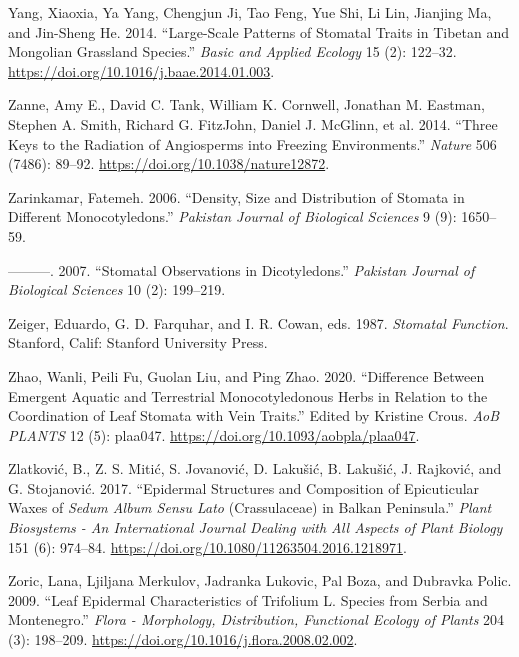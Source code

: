 \documentclass[
  12pt,
]{article}
\newlength{\cslhangindent}
\newlength{\cslentryspacingunit} %
\newenvironment{CSLReferences}[2] %
 {%
  \setlength{\parindent}{0pt}
  \ifodd #1
  \let\oldpar\par
  \def\par{\hangindent=\cslhangindent\oldpar}
  \fi
  \setlength{\parskip}{#2\cslentryspacingunit}
 }%
 {}
\begin{document}
\begin{CSLReferences}{1}{0}
\leavevmode{}%
Yang, Xiaoxia, Ya Yang, Chengjun Ji, Tao Feng, Yue Shi, Li Lin, Jianjing Ma, and Jin-Sheng He. 2014. {``Large-Scale Patterns of Stomatal Traits in {Tibetan} and {Mongolian} Grassland Species.''} \emph{Basic and Applied Ecology} 15 (2): 122--32. \url{https://doi.org/10.1016/j.baae.2014.01.003}.

\leavevmode{}%
Zanne, Amy E., David C. Tank, William K. Cornwell, Jonathan M. Eastman, Stephen A. Smith, Richard G. FitzJohn, Daniel J. McGlinn, et al. 2014. {``Three Keys to the Radiation of Angiosperms into Freezing Environments.''} \emph{Nature} 506 (7486): 89--92. \url{https://doi.org/10.1038/nature12872}.

\leavevmode{}%
Zarinkamar, Fatemeh. 2006. {``Density, Size and Distribution of Stomata in Different Monocotyledons.''} \emph{Pakistan Journal of Biological Sciences} 9 (9): 1650--59.

\leavevmode{}%
---------. 2007. {``Stomatal Observations in Dicotyledons.''} \emph{Pakistan Journal of Biological Sciences} 10 (2): 199--219.

\leavevmode{}%
Zeiger, Eduardo, G. D. Farquhar, and I. R. Cowan, eds. 1987. \emph{Stomatal Function}. Stanford, Calif: Stanford University Press.

\leavevmode{}%
Zhao, Wanli, Peili Fu, Guolan Liu, and Ping Zhao. 2020. {``Difference Between Emergent Aquatic and Terrestrial Monocotyledonous Herbs in Relation to the Coordination of Leaf Stomata with Vein Traits.''} Edited by Kristine Crous. \emph{AoB PLANTS} 12 (5): plaa047. \url{https://doi.org/10.1093/aobpla/plaa047}.

\leavevmode{}%
Zlatković, B., Z. S. Mitić, S. Jovanović, D. Lakušić, B. Lakušić, J. Rajković, and G. Stojanović. 2017. {``Epidermal Structures and Composition of Epicuticular Waxes of \emph{{Sedum} Album Sensu Lato} ({Crassulaceae}) in {Balkan} {Peninsula}.''} \emph{Plant Biosystems - An International Journal Dealing with All Aspects of Plant Biology} 151 (6): 974--84. \url{https://doi.org/10.1080/11263504.2016.1218971}.

\leavevmode{}%
Zoric, Lana, Ljiljana Merkulov, Jadranka Lukovic, Pal Boza, and Dubravka Polic. 2009. {``Leaf Epidermal Characteristics of {Trifolium} {L}. Species from {Serbia} and {Montenegro}.''} \emph{Flora - Morphology, Distribution, Functional Ecology of Plants} 204 (3): 198--209. \url{https://doi.org/10.1016/j.flora.2008.02.002}.

\end{CSLReferences}
\end{document}
